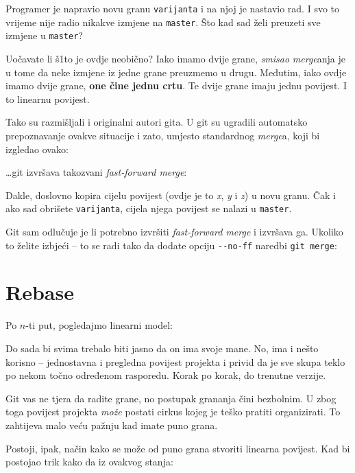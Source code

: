 

Programer je napravio novu granu \verb+varijanta+ i na njoj je nastavio rad.
I svo to vrijeme nije radio nikakve izmjene na \verb+master+.
Što kad sad želi preuzeti sve izmjene u \verb+master+?

Uočavate li š1to je ovdje neobično?
Iako imamo dvije grane, \emph{smisao} \emph{merge}anja je u tome da neke izmjene iz jedne grane preuzmemo u drugu.
Međutim, iako ovdje imamo dvije grane, \textbf{one čine jednu crtu}. 
Te dvije grane imaju jednu povijest. 
I to linearnu povijest.

Tako su razmišljali i originalni autori gita.
U git su ugradili automatsko prepoznavanje ovakve situacije i zato, umjesto standardnog \emph{merge}a, koji bi izgledao ovako:



\dots{}git izvršava takozvani \emph{fast-forward merge}:



Dakle, doslovno kopira cijelu povijest (ovdje je to \emph x, \emph y i \emph z) u novu granu.
Čak i ako sad obrišete \verb+varijanta+, cijela njega povijest se nalazi u \verb+master+.

Git sam odlučuje je li potrebno izvršiti \emph{fast-forward merge} i izvršava ga. Ukoliko to želite izbjeći -- to se radi tako da dodate opciju \verb+--no-ff+ naredbi \verb+git merge+:


\section*{Rebase}

Po $n$-ti put, pogledajmo linearni model:



Do sada bi svima trebalo biti jasno da on ima svoje mane.
No, ima i nešto korisno -- jednostavna i pregledna povijest projekta i privid da je sve skupa teklo po nekom točno određenom rasporedu.
Korak po korak, do trenutne verzije.

Git vas ne tjera da radite grane, no postupak grananja čini bezbolnim. 
U zbog toga povijest projekta \emph{može} postati cirkus kojeg je teško pratiti organizirati.
To zahtijeva malo veću pažnju kad imate puno grana.

Postoji, ipak, način kako se može od puno grana stvoriti linearna povijest.
Kad bi postojao trik kako da iz ovakvog stanja:

